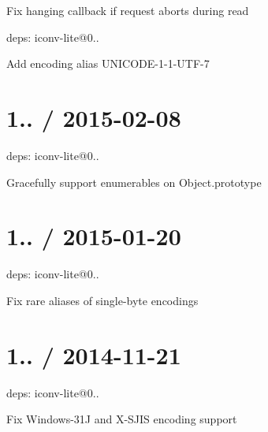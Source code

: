 
\begin{DoxyItemize}
\item Fix hanging callback if request aborts during read
\item deps\+: iconv-\/lite@0..
\begin{DoxyItemize}
\item Add encoding alias U\+N\+I\+C\+O\+D\+E-\/1-\/1-\/\+U\+T\+F-\/7
\end{DoxyItemize}
\end{DoxyItemize}

\section*{1.. / 2015-\/02-\/08 }


\begin{DoxyItemize}
\item deps\+: iconv-\/lite@0..
\begin{DoxyItemize}
\item Gracefully support enumerables on {\ttfamily Object.\+prototype}
\end{DoxyItemize}
\end{DoxyItemize}

\section*{1.. / 2015-\/01-\/20 }


\begin{DoxyItemize}
\item deps\+: iconv-\/lite@0..
\begin{DoxyItemize}
\item Fix rare aliases of single-\/byte encodings
\end{DoxyItemize}
\end{DoxyItemize}

\section*{1.. / 2014-\/11-\/21 }


\begin{DoxyItemize}
\item deps\+: iconv-\/lite@0..
\begin{DoxyItemize}
\item Fix Windows-\/31\+J and X-\/\+S\+J\+I\+S encoding support
\end{DoxyItemize}
\end{DoxyItemize}

